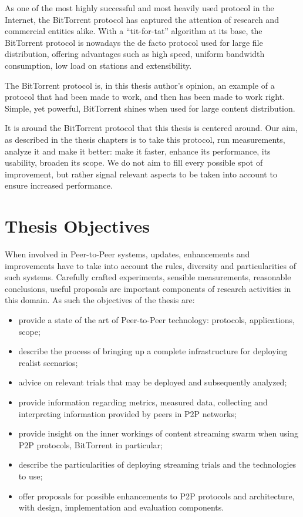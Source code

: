 As one of the most highly successful and most heavily used protocol in the
Internet, the BitTorrent protocol has captured the attention of research and
commercial entities alike. With a ``tit-for-tat'' algorithm at its base, the
BitTorrent protocol is nowadays the de facto protocol used for large file
distribution, offering advantages such as high speed, uniform bandwidth
consumption, low load on stations and extensibility.

The BitTorrent protocol is, in this thesis author's opinion, an example of a
protocol that had been made to work, and then has been made to work right.
Simple, yet powerful, BitTorrent shines when used for large content
distribution.

It is around the BitTorrent protocol that this thesis is centered around. Our
aim, as described in the thesis chapters is to take this protocol, run
measurements, analyze it and make it better: make it faster, enhance its
performance, its usability, broaden its scope. We do not aim to fill every
possible spot of improvement, but rather signal relevant aspects to be taken
into account to ensure increased performance.

\section{Thesis Objectives}
\label{sec:intro:objectives}

When involved in Peer-to-Peer systems, updates, enhancements and improvements
have to take into account the rules, diversity and particularities of such
systems. Carefully crafted experiments, sensible measurements, reasonable
conclusions, useful proposals are important components of research activities
in this domain. As such the objectives of the thesis are:

\begin{itemize}
  \item provide a state of the art of Peer-to-Peer technology: protocols,
  applications, scope;
  \item describe the process of bringing up a complete infrastructure for
  deploying realist scenarios;
  \item advice on relevant trials that may be deployed and subsequently
  analyzed;
  \item provide information regarding metrics, measured data, collecting and
  interpreting information provided by peers in P2P networks;
  \item provide insight on the inner workings of content streaming swarm when
  using P2P protocols, BitTorrent in particular;
  \item describe the particularities of deploying streaming trials and the
  technologies to use;
  \item offer proposals for possible enhancements to P2P protocols and
  architecture, with design, implementation and evaluation components.
\end{itemize}

